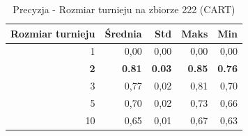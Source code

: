 \begin{table}[htbp]
\centering
\small
\setlength{\tabcolsep}{6pt}
\renewcommand{\arraystretch}{1.2}
\caption{Precyzja - Rozmiar turnieju na zbiorze 222 (CART)}
\label{tab:CART_tournament_size_222_precision}
\begin{tabular}{r|r|r|r|r}
\toprule
Rozmiar turnieju & Średnia & Std & Maks & Min \\
\hline
1 & 0,00 & 0,00 & 0,00 & 0,00 \\
\textbf{2} & \textbf{0.81} & \textbf{0.03} & \textbf{0.85} & \textbf{0.76} \\
3 & 0,77 & 0,02 & 0,81 & 0,70 \\
5 & 0,70 & 0,02 & 0,73 & 0,66 \\
10 & 0,65 & 0,01 & 0,67 & 0,63 \\
\bottomrule
\end{tabular}
\end{table}